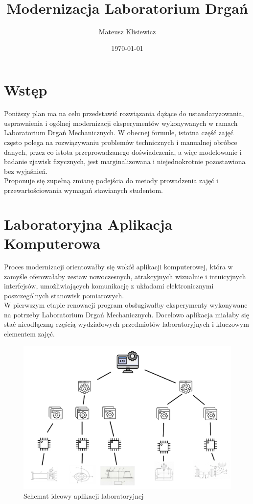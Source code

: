 \documentclass[12pt]{article}
\title{Modernizacja Laboratorium Drgań}
\author{Mateusz Klisiewicz}
\date{\today}
\title{\mytitle \\
  \large \mysubtitle}
\begin{document}
\pagestyle{fancy}
\maketitle
\newpage
\section*{Wstęp}
Poniższy plan ma na celu przedstawić rozwiązania dążące do ustandaryzowania, usprawnienia i ogólnej modernizacji eksperymentów wykonywanych w ramach Laboratorium Drgań Mechanicznych. W obecnej formule, istotna część zajęć często polega na rozwiązywaniu problemów technicznych i manualnej obróbce danych, przez co istota przeprowadzanego doświadczenia, a więc modelowanie i badanie zjawisk fizycznych, jest marginalizowana i niejednokrotnie pozostawiona bez wyjaśnień. \\Proponuje się zupełną zmianę podejścia do metody prowadzenia zajęć i przewartościowania wymagań stawianych studentom.
\section*{Laboratoryjna Aplikacja Komputerowa}
Proces modernizacji orientowałby się wokół aplikacji komputerowej, która w zamyśle oferowałaby zestaw nowoczesnych, atrakcyjnych wizualnie i intuicyjnych interfejsów, umożliwiających komunikację z układami elektronicznymi poszczególnych stanowisk pomiarowych.\\ W pierwszym etapie renowacji program obsługiwałby eksperymenty wykonywane na potrzeby Laboratorium Drgań Mechanicznych. Docelowo aplikacja miałaby się stać nieodłączną częścią wydziałowych przedmiotów laboratoryjnych i kluczowym elementem zajęć. 
\begin{figure}[h]
\centering
\includegraphics[width=16cm]{app_sch}
\caption{Schemat ideowy aplikacji laboratoryjnej}
\end{figure}
\newpage
\end{document}
